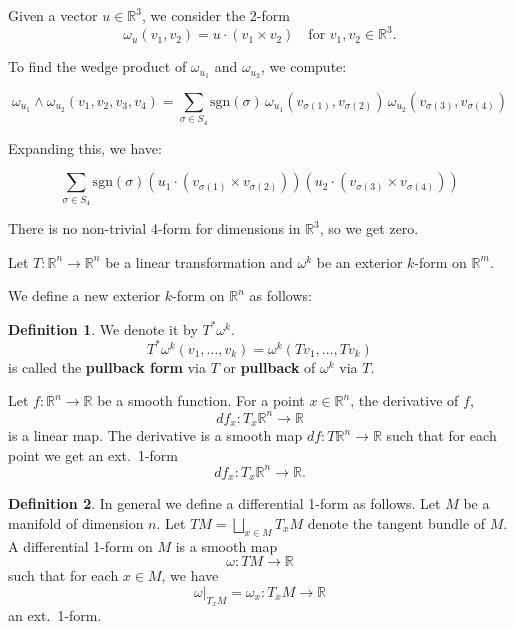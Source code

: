 \documentclass[11pt]{article}
\theoremstyle{definition}
\newtheorem{definition}{Definition}[section]
\theoremstyle{remark}
\begin{document}
Given a vector $u \in \mathbb{R}^3$, we consider the 2-form
\[
\omega_u(v_1, v_2) = u \cdot (v_1 \times v_2) \quad \text{for } v_1, v_2 \in \mathbb{R}^3.
\]

To find the wedge product of $\omega_{u_1}$ and $\omega_{u_2}$, we compute:

\[
\omega_{u_1} \wedge \omega_{u_2}(v_1, v_2, v_3, v_4) = \sum_{\sigma \in S_4} \text{sgn}(\sigma) \, \omega_{u_1}(v_{\sigma(1)}, v_{\sigma(2)}) \, \omega_{u_2}(v_{\sigma(3)}, v_{\sigma(4)})
\]

Expanding this, we have:

\[
\sum_{\sigma \in S_4} \text{sgn}(\sigma) \left( u_1 \cdot (v_{\sigma(1)} \times v_{\sigma(2)}) \right) \left( u_2 \cdot (v_{\sigma(3)} \times v_{\sigma(4)}) \right)
\]

There is no non-trivial 4-form for dimensions in $\mathbb{R}^3$, so we get zero.

Let \( T: \mathbb{R}^n \to \mathbb{R}^n \) be a linear transformation and \( \omega^k \) be an exterior \( k \)-form on \( \mathbb{R}^m \).

We define a new exterior \( k \)-form on \( \mathbb{R}^n \) as follows:

\begin{definition}\label{def:pullback_form}
We denote it by \( T^* \omega^k \).
\[
T^* \omega^k (v_1, \ldots, v_k) = \omega^k (T v_1, \ldots, T v_k)
\]
is called the \textbf{pullback form} via \( T \) or \textbf{pullback} of \( \omega^k \) via \( T \).
\end{definition}

Let $f: \mathbb{R}^n \to \mathbb{R}$ be a smooth function. For a point $x \in \mathbb{R}^n$, the derivative of $f$,
\[
df_x: T_x \mathbb{R}^n \to \mathbb{R}
\]
is a linear map. The derivative is a smooth map $df: T\mathbb{R}^n \to \mathbb{R}$ such that for each point we get an ext.\ 1-form
\[
df_x: T_x \mathbb{R}^n \to \mathbb{R}.
\]

\begin{definition}\label{def:differential_1_form}
In general we define a differential 1-form as follows. Let $M$ be a manifold of dimension $n$. Let $TM = \bigsqcup_{x \in M} T_x M$ denote the tangent bundle of $M$. A differential 1-form on $M$ is a smooth map
\[
\omega: TM \to \mathbb{R}
\]
such that for each $x \in M$, we have
\[
\omega|_{T_x M} = \omega_x: T_x M \to \mathbb{R}
\]
an ext.\ 1-form.
\end{definition}
\end{document}
